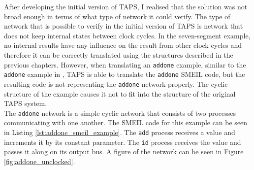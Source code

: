 After developing the initial version of TAPS, I realised that the solution was not broad enough in terms of what type of network it could verify. The type of network that is possible to verify in the initial version of TAPS is network that does not keep internal states between clock cycles. In the seven-segment example, no internal results have any influence on the result from other clock cycles and therefore it can be correctly translated using the structures described in the previous chapters.
However, when translating an \texttt{addone} example, similar to the \texttt{addone} example in \cite{smeil}, TAPS is able to translate the \texttt{addone} SMEIL code, but the resulting \cspm{} code is not representing the \texttt{addone} network properly. The cyclic structure of the example causes it not to fit into the structure of the original TAPS system.\\

The \texttt{addone} network is a simple cyclic network that consists of two processes communicating with one another. The SMEIL code for this example can be seen in Listing \ref{lst:addone_smeil_example}. The \texttt{add} process receives a value and increments it by its constant parameter. The \texttt{id} process receives the value and passes it along on its output bus.
A figure of the network can be seen in Figure \ref{fig:addone_unclocked}.\\

